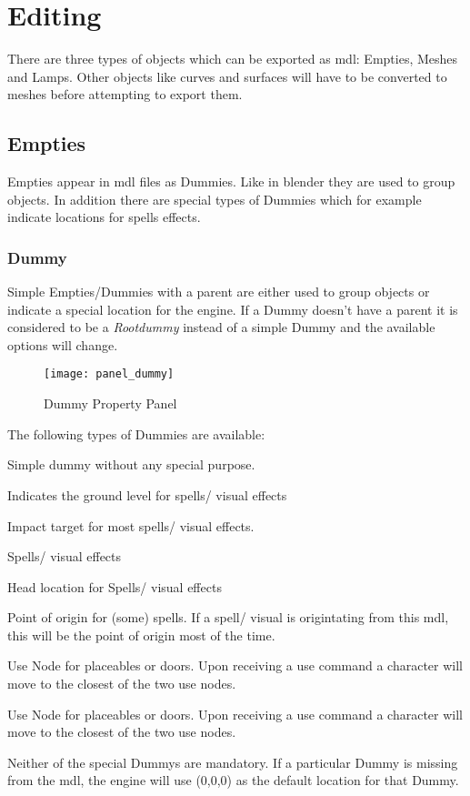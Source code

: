 \section{Editing}
There are three types of objects which can be exported as mdl: Empties,
Meshes and Lamps. Other objects like curves and surfaces will have to be
converted to meshes before attempting to export them.

\subsection{Empties}
Empties appear in mdl files as Dummies. Like in blender they are used to group
objects. In addition there are special types of Dummies which for
example indicate locations for spells effects.

\subsubsection{Dummy}
Simple Empties/Dummies with a parent are either used to group objects or
indicate a special location for the engine. If a Dummy doesn't have a
parent it is considered to be a {\textit{Rootdummy}} instead of a simple Dummy
and the available options will change.

\begin{figure}
  \centering
  \texttt{[image: panel\_dummy]}
  \caption[panel dummy]{Dummy Property Panel}
  \label{fig:panel_dummy}
\end{figure}

The following types of Dummies are available:
\begin{description}[leftmargin=6em,style=nextline]
    \item[None] Simple dummy without any special purpose.
    \item[Ground] Indicates the ground level for spells/ visual effects
    \item[Impact] Impact target for most spells/ visual effects.
    \item[Head Hit] Spells/ visual effects
    \item[Head] Head location for Spells/ visual effects
    \item[Hand] Point of origin for (some) spells. If a spell/ visual is origintating from this mdl, this will be the point of origin most of the time.
    \item[Use 1] Use Node for placeables or doors. Upon receiving a use command a character will move to the closest of the two use nodes.
    \item[Use 2] Use Node for placeables or doors. Upon receiving a use command a character will move to the closest of the two use nodes.
\end{description}
Neither of the special Dummys are mandatory. If a particular Dummy is
missing from the mdl, the engine will use (0,0,0) as the default location
for that Dummy. \\

